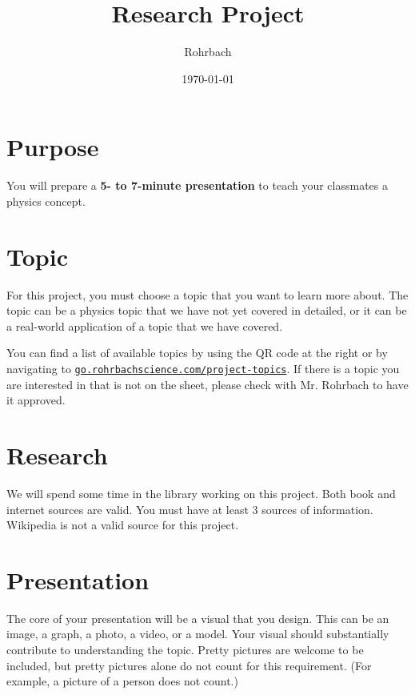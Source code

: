 \documentclass[11pt]{exam}
\title{Research Project}
\author{Rohrbach}
\date{\today}
\begin{document}
\maketitle

\section*{Purpose}
 You will prepare a {\bf 5- to 7-minute presentation} to teach your classmates a physics concept.  

\section*{Topic}



For this project, you must choose a topic that you want to learn more about.  The topic can be a physics topic that we have not yet covered in detailed, or it can be a real-world application of a topic that we have covered.

\begin{floatingfigure}{1.1in}
\end{floatingfigure}

You can find a list of available topics by using the QR code at the right or by navigating to \texttt{\href{https://go.rohrbachscience.com/project-topics}{go.rohrbachscience.com/project-topics}}.  If there is a topic you are interested in that is not on the sheet, please check with Mr. Rohrbach to have it approved.






\section*{Research}
We will spend some time in the library working on this project.  Both book and internet sources are valid.  You must have at least 3 sources of information.  {\sc Wikipedia is not a valid source for this project.} 

\section*{Presentation}
The core of your presentation will be a visual that you design.  This can be an image, a graph, a photo, a video, or a model.  Your visual should substantially contribute to understanding the topic.  Pretty pictures are welcome to be included, but pretty pictures alone do not count for this requirement. (For example, a picture of a person does not count.) 
\end{document}
